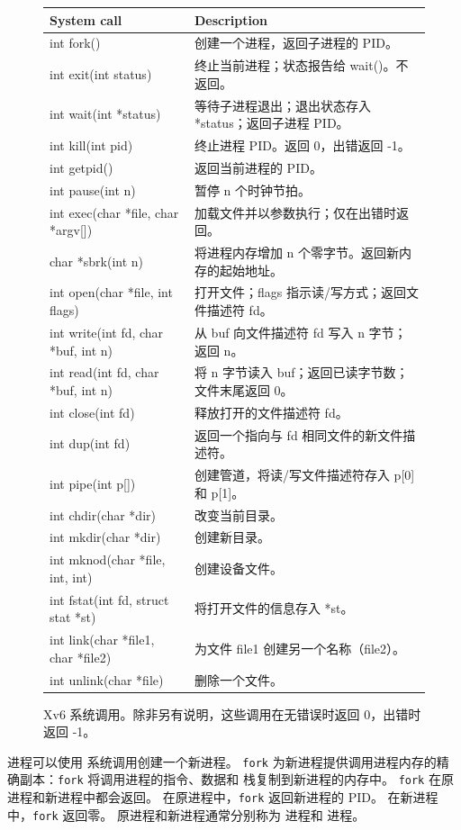 \begin{figure}[t]
\center
\begin{tabular}{ll}
{\bf System call} & {\bf Description} \\
\midrule
int fork() & 创建一个进程，返回子进程的 PID。 \\
int exit(int status) & 终止当前进程；状态报告给 wait()。不返回。 \\
int wait(int *status) & 等待子进程退出；退出状态存入 *status；返回子进程 PID。 \\
int kill(int pid) & 终止进程 PID。返回 0，出错返回 -1。 \\
int getpid() & 返回当前进程的 PID。 \\
int pause(int n) & 暂停 n 个时钟节拍。 \\
int exec(char *file, char *argv[]) & 加载文件并以参数执行；仅在出错时返回。 \\
char *sbrk(int n) & 将进程内存增加 n 个零字节。返回新内存的起始地址。 \\
int open(char *file, int flags) & 打开文件；flags 指示读/写方式；返回文件描述符 fd。 \\
int write(int fd, char *buf, int n) & 从 buf 向文件描述符 fd 写入 n 字节；返回 n。 \\
int read(int fd, char *buf, int n) & 将 n 字节读入 buf；返回已读字节数；文件末尾返回 0。 \\
int close(int fd) & 释放打开的文件描述符 fd。 \\
int dup(int fd) & 返回一个指向与 fd 相同文件的新文件描述符。\\
int pipe(int p[]) & 创建管道，将读/写文件描述符存入 p[0] 和 p[1]。 \\
int chdir(char *dir) & 改变当前目录。 \\
int mkdir(char *dir) & 创建新目录。 \\
int mknod(char *file, int, int) & 创建设备文件。 \\
int fstat(int fd, struct stat *st) & 将打开文件的信息存入 *st。 \\
int link(char *file1, char *file2) & 为文件 file1 创建另一个名称（file2）。 \\
int unlink(char *file) & 删除一个文件。 \\
\end{tabular}
\caption{Xv6 系统调用。除非另有说明，这些调用在无错误时返回 0，出错时返回 -1。}
\label{fig:api}
\end{figure}

进程可以使用
系统调用创建一个新进程。
\lstinline{fork}
为新进程提供调用进程内存的精确副本：\lstinline{fork} 将调用进程的指令、数据和
栈复制到新进程的内存中。
\lstinline{fork}
在原进程和新进程中都会返回。
在原进程中，\lstinline{fork} 返回新进程的
PID。
在新进程中，\lstinline{fork} 返回零。
原进程和新进程通常分别称为
进程和
进程。

